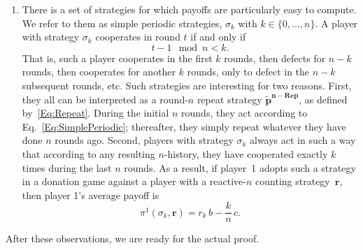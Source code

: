 \documentclass[11pt]{article}
\theoremstyle{plainCl1}
\theoremstyle{plainCl2}
\begin{document}
\begin{enumerate}
\item There is a set of strategies for which payoffs are particularly easy to compute. 
We refer to them as simple periodic strategies, $\sigma_{k}$ with $k\!\in\!\{0,\ldots,n\}$. 
A player with strategy $\sigma_{k}$ cooperates in round $t$ if and only if 
\begin{equation} \label{Eq:SimplePeriodic}
t-1\!\!\mod n < k.
\end{equation}
That is, such a player cooperates in the first $k$ rounds, then defects for $n\!-\!k$ rounds, then cooperates for another $k$ rounds, only to defect in the $n\!-\!k$ subsequent rounds, etc. 
Such strategies are interesting for two reasons. 
First, they all can be interpreted as a round-$n$ repeat strategy $\mathbf{\tilde p^{n-\text{Rep}}}$, as defined by~\eqref{Eq:Repeat}.
During the initial $n$ rounds, they act according to Eq.~\eqref{Eq:SimplePeriodic}; thereafter, they simply repeat whatever they have done $n$ rounds ago. 
Second, players with  strategy $\sigma_{k}$ always act in such a way that according to any resulting $n$-history, they have cooperated exactly $k$ times during the last $n$ rounds. As a result, if player~1 adopts such a strategy in a donation game against a player with a reactive-$n$ counting strategy~$\mathbf{r}$, then player 1's average payoff is 
\begin{equation} \label{Eq:PaySimplePeriodic}
\pi^1(\sigma_{k},\mathbf{r}) = r_k\,b - \frac{k}{n}\,c.
\end{equation}
\end{enumerate}

\noindent
After these observations, we are ready for the actual proof. 
\end{document}
